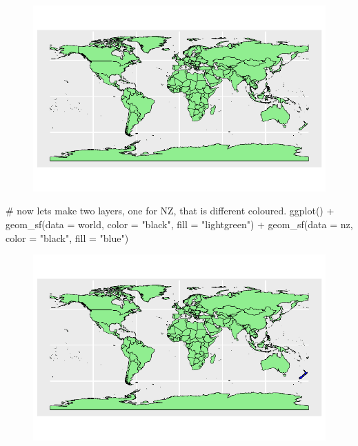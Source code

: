 \documentclass[
  letterpaper,
  DIV=11,
  numbers=noendperiod]{scrartcl}
\newenvironment{Shaded}{\begin{snugshade}}{\end{snugshade}}
\newcommand{\AttributeTok}[1]{\textcolor[rgb]{0.40,0.45,0.13}{#1}}
\newcommand{\CommentTok}[1]{\textcolor[rgb]{0.37,0.37,0.37}{#1}}
\newcommand{\FunctionTok}[1]{\textcolor[rgb]{0.28,0.35,0.67}{#1}}
\newcommand{\NormalTok}[1]{\textcolor[rgb]{0.00,0.23,0.31}{#1}}
\newcommand{\SpecialCharTok}[1]{\textcolor[rgb]{0.37,0.37,0.37}{#1}}
\newcommand{\StringTok}[1]{\textcolor[rgb]{0.13,0.47,0.30}{#1}}
\begin{document}
\begin{figure}[H]

{\centering \includegraphics{Introduction-to-mapping_files/figure-pdf/unnamed-chunk-8-1.pdf}

}

\end{figure}

\begin{Shaded}
\begin{Highlighting}[]
\CommentTok{\# now lets make two layers, one for NZ, that is different coloured.}
\FunctionTok{ggplot}\NormalTok{() }\SpecialCharTok{+}      
  \FunctionTok{geom\_sf}\NormalTok{(}\AttributeTok{data =}\NormalTok{ world, }\AttributeTok{color =} \StringTok{"black"}\NormalTok{, }\AttributeTok{fill =} \StringTok{"lightgreen"}\NormalTok{) }\SpecialCharTok{+}
  \FunctionTok{geom\_sf}\NormalTok{(}\AttributeTok{data =}\NormalTok{ nz, }\AttributeTok{color =} \StringTok{"black"}\NormalTok{, }\AttributeTok{fill =} \StringTok{"blue"}\NormalTok{)}
\end{Highlighting}
\end{Shaded}

\begin{figure}[H]

{\centering \includegraphics{Introduction-to-mapping_files/figure-pdf/unnamed-chunk-8-2.pdf}

}

\end{figure}
\end{document}

